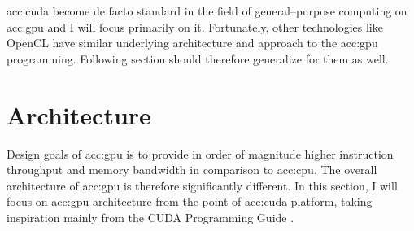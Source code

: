 \acrshort{acc:cuda} become de facto standard in the field of general--purpose computing on \acrshort{acc:gpu} and I will focus primarily on it. Fortunately, other technologies like OpenCL have similar underlying architecture and approach to the \acrshort{acc:gpu} programming. Following section should therefore generalize for them as well.




\section{Architecture}

Design goals of \acrshort{acc:gpu} is to provide in order of magnitude higher instruction throughput and memory bandwidth in comparison to \acrshort{acc:cpu}. The overall architecture of \acrshort{acc:gpu} is therefore significantly different. In this section, I will focus on \acrshort{acc:gpu} architecture from the point of \acrshort{acc:cuda} platform, taking inspiration mainly from the CUDA Programming Guide \citep{CUDAguide}.

